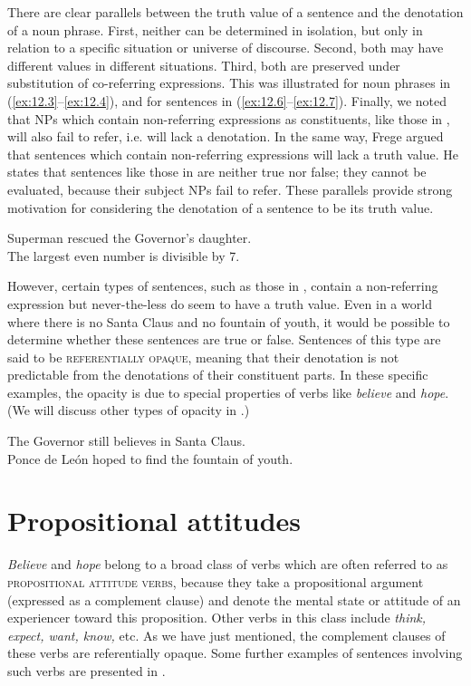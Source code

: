 There are clear parallels between the truth value of a sentence and the denotation of a noun phrase. First, neither can be determined in isolation, but only in relation to a specific situation or universe of discourse. Second, both may have different values in different situations. Third, both are preserved under substitution of co-referring expressions. This was illustrated for noun phrases in (\ref{ex:12.3}--\ref{ex:12.4}), and for sentences in (\ref{ex:12.6}--\ref{ex:12.7}). Finally, we noted that NPs which contain non-referring expressions as constituents, like those in , will also fail to refer, i.e. will lack a denotation. In the same way, Frege argued that sentences which contain non-referring expressions will lack a truth value. He states that sentences like those in  are neither true nor false; they cannot be evaluated, because their subject NPs fail to refer. These parallels provide strong motivation for considering the denotation of a sentence to be its truth value.


\ea \label{ex:12.8}
\ea Superman rescued the Governor’s daughter.\\
\ex The largest even number is divisible by 7.
                       \z
\z

However, certain types of sentences, such as those in , contain a non-referring expression but never-the-less do seem to have a truth value. Even in a world where there is no Santa Claus and no fountain of youth, it would be possible to determine whether these sentences are true or false. Sentences of this type are said to be \textsc{referentially opaque}, meaning that their denotation is not predictable from the denotations of their constituent parts. In these specific examples, the opacity is due to special properties of verbs like \textit{believe} and \textit{hope}. (We will discuss other types of opacity in .)

\ea \label{ex:12.9}
\ea The Governor still believes in Santa Claus.\\
\ex Ponce de León hoped to find the fountain of youth.
                       \z
\z

\section{Propositional attitudes}\label{sec:12.4}

\textit{Believe} and \textit{hope} belong to a broad class of verbs which are often referred to as \textsc{propositional attitude verbs}, because they take a propositional argument (expressed as a complement clause) and denote the mental state or attitude of an experiencer toward this proposition. Other verbs in this class include \textit{think, expect, want, know,} etc. As we have just mentioned, the complement clauses of these verbs are referentially opaque. Some further examples of sentences involving such verbs are presented in .


